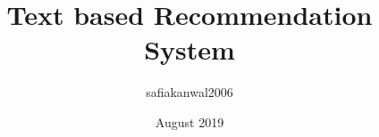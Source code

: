 \documentclass{article}
\title{Text based Recommendation System}
\author{safiakanwal2006 }
\date{August 2019}
\begin{document}

\maketitle

\pagebreak{}

\pagebreak{}

\pagebreak{}



\pagebreak{}

\pagebreak{}

\pagebreak{}
\newpage

\pagebreak{}
\newpage

\pagebreak{}




\end{document}
